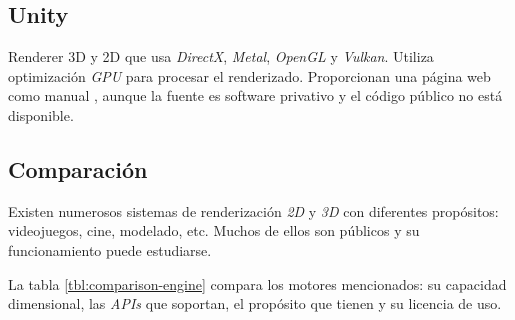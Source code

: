 \subsection{Unity}
Renderer 3D y 2D que usa \textit{DirectX}, \textit{Metal}, \textit{OpenGL} y \textit{Vulkan}. Utiliza optimización \textit{GPU} para procesar el renderizado.
Proporcionan una página web como manual \cite{webUnityManual}, aunque la fuente es software privativo y el código público no está disponible.

\subsection{Comparación}
Existen numerosos sistemas de renderización \textit{2D} y \textit{3D} con diferentes propósitos: videojuegos, cine, modelado, etc. Muchos de ellos son públicos y su funcionamiento puede estudiarse.

La tabla \ref{tbl:comparison-engine} compara los motores mencionados: su capacidad dimensional, las \textit{APIs} que soportan, el propósito que tienen y su licencia de uso.


